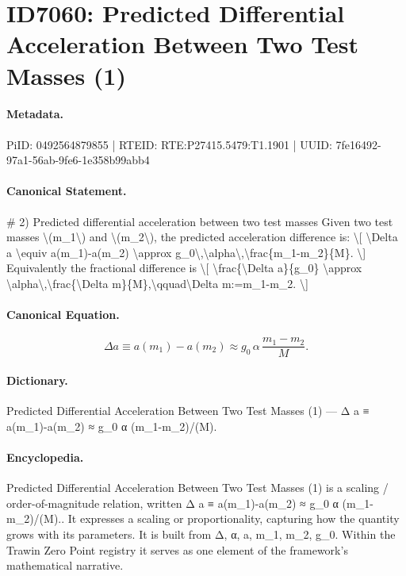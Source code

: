 \section*{ID7060: Predicted Differential Acceleration Between Two Test Masses (1)}
\paragraph{Metadata.}
PiID: 0492564879855 | RTEID: RTE:P27415.5479:T1.1901 | UUID: 7fe16492-97a1-56ab-9fe6-1e358b99abb4

\paragraph{Canonical Statement.}
\# 2) Predicted differential acceleration between two test masses Given two test masses \textbackslash{}(m\_1\textbackslash{}) and \textbackslash{}(m\_2\textbackslash{}), the predicted acceleration difference is: \textbackslash{}[ \textbackslash{}Delta a \textbackslash{}equiv a(m\_1)-a(m\_2) \textbackslash{}approx g\_0\textbackslash{},\textbackslash{}alpha\textbackslash{},\textbackslash{}frac\{m\_1-m\_2\}\{M\}. \textbackslash{}] Equivalently the fractional difference is \textbackslash{}[ \textbackslash{}frac\{\textbackslash{}Delta a\}\{g\_0\} \textbackslash{}approx \textbackslash{}alpha\textbackslash{},\textbackslash{}frac\{\textbackslash{}Delta m\}\{M\},\textbackslash{}qquad\textbackslash{}Delta m:=m\_1-m\_2. \textbackslash{}]

\paragraph{Canonical Equation.}
\[
\Delta a \equiv a(m_1)-a(m_2) \approx g_0\,\alpha\,\frac{m_1-m_2}{M}.
\]

\paragraph{Dictionary.}
Predicted Differential Acceleration Between Two Test Masses (1) — Δ a ≡ a(m\_1)-a(m\_2) ≈ g\_0 α (m\_1-m\_2)/(M).

\paragraph{Encyclopedia.}
Predicted Differential Acceleration Between Two Test Masses (1) is a scaling / order-of-magnitude relation, written Δ a ≡ a(m\_1)-a(m\_2) ≈ g\_0 α (m\_1-m\_2)/(M).. It expresses a scaling or proportionality, capturing how the quantity grows with its parameters. It is built from Δ, α, a, m\_1, m\_2, g\_0. Within the Trawin Zero Point registry it serves as one element of the framework's mathematical narrative.
